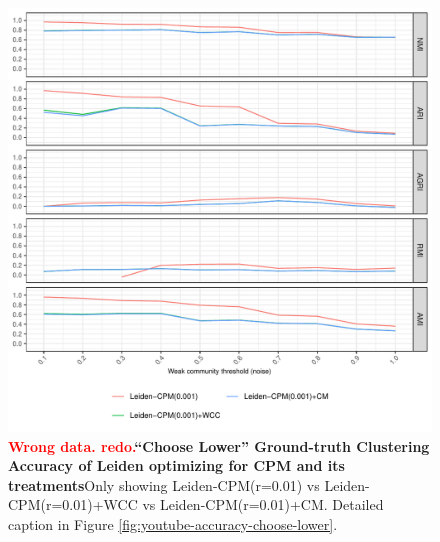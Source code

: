 \documentclass[aps,pre,superscriptaddress]{revtex4}
\begin{document}
\begin{figure}[!htpb]
	\centering
	\includegraphics[]{figures/choose_lower_youtube_leiden_cpm_accuracy.pdf}
	\caption[]{\textbf{\textcolor{red}{Wrong data. redo.}``Choose Lower'' Ground-truth Clustering Accuracy of Leiden optimizing for CPM and its treatments}Only showing Leiden-CPM(r=0.01) vs Leiden-CPM(r=0.01)+WCC vs Leiden-CPM(r=0.01)+CM. Detailed caption in Figure \ref{fig:youtube-accuracy-choose-lower}.}
	\label{fig:choose-lower-leiden-cpm}
\end{figure}
\end{document}
